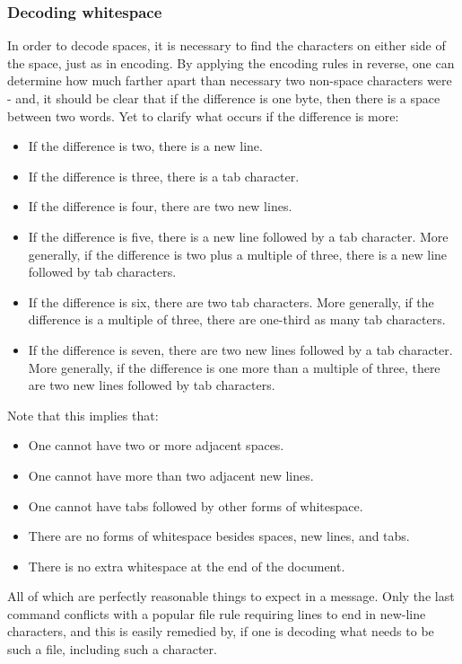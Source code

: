 \documentclass{article}
\begin{document}
\subsubsection{Decoding whitespace}
In order to decode spaces, it is necessary to find the characters on either side of the space, just as in encoding.  By applying the encoding rules in reverse, one can determine how much farther apart than necessary two non-space characters were - and, it should be clear that if the difference is one byte, then there is a space between two words.  Yet to clarify what occurs if the difference is more:

\begin{itemize}
\item If the difference is two, there is a new line.
\item If the difference is three, there is a tab character.
\item If the difference is four, there are two new lines.
\item If the difference is five, there is a new line followed by a tab character.  More generally, if the difference is two plus a multiple of three, there is a new line followed by tab characters.
\item If the difference is six, there are two tab characters.  More generally, if the difference is a multiple of three, there are one-third as many tab characters.
\item If the difference is seven, there are two new lines followed by a tab character.  More generally, if the difference is one more than a multiple of three, there are two new lines followed by tab characters.
\end{itemize}

Note that this implies that:
\begin{itemize}
\item One cannot have two or more adjacent spaces.
\item One cannot have more than two adjacent new lines.
\item One cannot have tabs followed by other forms of whitespace.
\item There are no forms of whitespace besides spaces, new lines, and tabs.
\item There is no extra whitespace at the end of the document.
\end{itemize}
All of which are perfectly reasonable things to expect in a message.  Only the last command conflicts with a popular file rule requiring lines to end in new-line characters, and this is easily remedied by, if one is decoding what needs to be such a file, including such a character.
\end{document}
